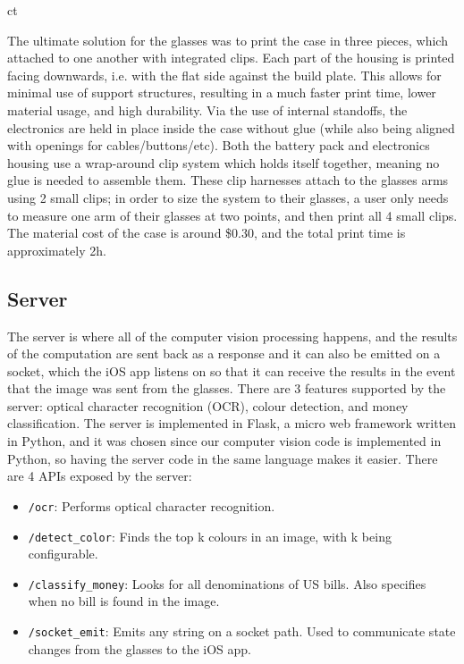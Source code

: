 ct\documentclass[a4paper,11pt]{article}
\begin{document}
The ultimate solution for the glasses was to print the case in three pieces, which attached to one another with integrated clips. Each part of the housing is printed facing downwards, i.e. with the flat side against the build plate. This allows for minimal use of support structures, resulting in a much faster print time, lower material usage, and high durability. Via the use of internal standoffs, the electronics are held in place inside the case without glue (while also being aligned with openings for cables/buttons/etc). Both the battery pack and electronics housing use a wrap-around clip system which holds itself together, meaning no glue is needed to assemble them. These clip harnesses attach to the glasses arms using 2 small clips; in order to size the system to their glasses, a user only needs to measure one arm of their glasses at two points, and then print all 4 small clips. The material cost of the case is around \$0.30, and the total print time is approximately 2h.

\subsection{Server}
\label{server}
The server is where all of the computer vision processing happens, and the results of the computation are sent back as a response and it can also be emitted on a socket, which the iOS app listens on so that it can receive the results in the event that the image was sent from the glasses. There are 3 features supported by the server: optical character recognition (OCR), colour detection, and money classification. The server is implemented in Flask, a micro web framework written in Python, and it was chosen since our computer vision code is implemented in Python, so having the server code in the same language makes it easier. There are 4 APIs exposed by the server:

\begin{itemize}
    \item \texttt{/ocr}: Performs optical character recognition.
    \item \texttt{/detect\_color}: Finds the top k colours in an image, with k being configurable.
    \item \texttt{/classify\_money}: Looks for all denominations of US bills. Also specifies when no bill is found in the image.
    \item \texttt{/socket\_emit}: Emits any string on a socket path. Used to communicate state changes from the glasses to the iOS app.
\end{itemize}
\end{document}
